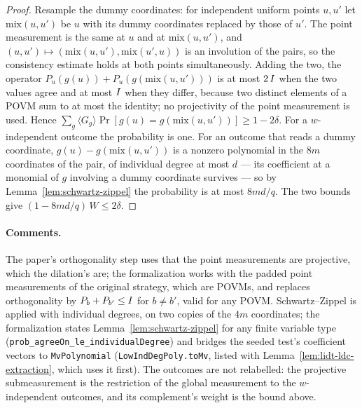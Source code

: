 \begin{proof}
\leanok
Resample the dummy coordinates: for independent uniform points $u, u'$ let $\mathrm{mix}(u, u')$
be $u$ with its dummy coordinates replaced by those of $u'$. The point measurement is the same at
$u$ and at $\mathrm{mix}(u, u')$, and $(u, u') \mapsto (\mathrm{mix}(u, u'), \mathrm{mix}(u', u))$
is an involution of the pairs, so the consistency estimate holds at both points simultaneously.
Adding the two, the operator $P_u(g(u)) + P_u(g(\mathrm{mix}(u, u')))$ is at most $2\,I$ when the
two values agree and at most $I$ when they differ, because two distinct elements of a POVM sum
to at most the identity; no projectivity of the point measurement is used. Hence
$\sum_g \langle G_g \rangle \Pr[g(u) = g(\mathrm{mix}(u, u'))] \geq 1 - 2\delta$. For a
$w$-independent outcome the probability is one. For an outcome that reads a dummy coordinate,
$g(u) - g(\mathrm{mix}(u, u'))$ is a nonzero polynomial in the $8m$ coordinates of the pair, of
individual degree at most $d$ --- its coefficient at a monomial of $g$ involving a dummy
coordinate survives --- so by Lemma~\ref{lem:schwartz-zippel} the probability is at most $8md/q$.
The two bounds give $(1 - 8md/q)\,W \leq 2\delta$.
\end{proof}

\paragraph{Comments.} The paper's orthogonality step uses that the point measurements are
projective, which the dilation's are; the formalization works with the padded point measurements
of the original strategy, which are POVMs, and replaces orthogonality by
$P_b + P_{b'} \leq I$ for $b \neq b'$, valid for any POVM. Schwartz--Zippel is applied with
individual degrees, on two copies of the $4m$ coordinates; the formalization states
Lemma~\ref{lem:schwartz-zippel} for any finite variable type
(\texttt{prob\_agreeOn\_le\_individualDegree}) and bridges the seeded test's coefficient vectors
to \texttt{MvPolynomial} (\texttt{LowIndDegPoly.toMv}, listed with
Lemma~\ref{lem:lidt-ldc-extraction}, which uses it first). The outcomes are not relabelled: the
projective submeasurement is the restriction of the global measurement to the $w$-independent
outcomes, and its complement's weight is the bound above.

